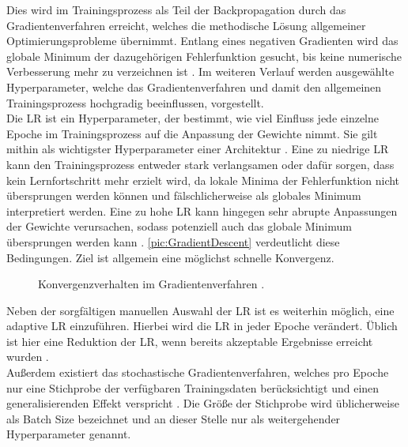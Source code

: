 \noindent
Dies wird im Trainingsprozess als Teil der Backpropagation durch das Gradientenverfahren erreicht, welches die methodische Lösung allgemeiner Optimierungsprobleme übernimmt. Entlang eines negativen Gradienten wird das globale Minimum der dazugehörigen Fehlerfunktion gesucht, bis keine numerische Verbesserung mehr zu verzeichnen ist \cite[S.~428]{ZHA20}. Im weiteren Verlauf werden ausgewählte Hyperparameter, welche das Gradientenverfahren und damit den allgemeinen Trainingsprozess hochgradig beeinflussen, vorgestellt.\\

\noindent
Die \ac{LR} ist ein Hyperparameter, der bestimmt, wie viel Einfluss jede einzelne Epoche im Trainingsprozess auf die Anpassung der Gewichte nimmt. Sie gilt mithin als wichtigster Hyperparameter einer Architektur \cite[S.~208]{GOO16}. Eine zu niedrige \ac{LR} kann den Trainingsprozess entweder stark verlangsamen oder dafür sorgen, dass kein Lernfortschritt mehr erzielt wird, da lokale Minima der Fehlerfunktion nicht übersprungen werden können und fälschlicherweise als globales Minimum interpretiert werden. Eine zu hohe \ac{LR} kann hingegen sehr abrupte Anpassungen der Gewichte verursachen, sodass potenziell auch das globale Minimum übersprungen werden kann \cite[S.~414-415]{ZHA20}. \autoref{pic:GradientDescent} verdeutlicht diese Bedingungen. Ziel ist allgemein eine möglichst schnelle Konvergenz.\\

\begin{figure}[h!]
  \centering
  \caption{Konvergenzverhalten im Gradientenverfahren \cite[S.~429]{ZHA20}.}
  \label{pic:GradientDescent}
\end{figure}
\newpage

\noindent
Neben der sorgfältigen manuellen Auswahl der \ac{LR} ist es weiterhin möglich, eine adaptive \ac{LR} einzuführen. Hierbei wird die \ac{LR} in jeder Epoche verändert. Üblich ist hier eine Reduktion der \ac{LR}, wenn bereits akzeptable Ergebnisse erreicht wurden \cite[S.~433]{ZHA20}.\\

\noindent
Außerdem existiert das stochastische Gradientenverfahren, welches pro Epoche nur eine Stichprobe der verfügbaren Trainingsdaten berücksichtigt und einen generalisierenden Effekt verspricht \cite[S.~290]{GOO16}. Die Größe der Stichprobe wird üblicherweise als Batch Size bezeichnet und an dieser Stelle nur als weitergehender Hyperparameter genannt.\\

